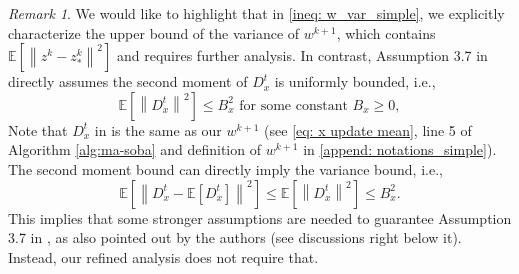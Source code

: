 \documentclass[10pt]{article}
\theoremstyle{remark}
\newtheorem*{remark}{Remark}
\newcommand{\E}{\mathbb{E}}
\newcommand{\norm}[1]{\left\|#1\right\|}
\begin{document}
\begin{remark}
    We would like to highlight that in \eqref{ineq: w_var_simple}, we explicitly characterize the upper bound of the variance of $w^{k+1}$, which contains $\E\left[\norm{z^k -z_*^k}^2\right]$ and requires further analysis. In contrast, Assumption 3.7 in \cite{dagreou2022framework} directly assumes the second moment of $D_x^t$ is uniformly bounded, i.e.,
    \[
        \E\left[\norm{D_x^t}^2\right]\leq B_x^2 \text{ for some constant } B_x \geq 0,
    \]
    Note that $D_x^t$ in \cite{dagreou2022framework} is the same as our $w^{k+1}$ (see \eqref{eq: x update mean}, line 5 of Algorithm \ref{alg:ma-soba} and definition of $w^{k+1}$ in \eqref{append: notations_simple}). The second moment bound can directly imply the variance bound, i.e.,
    \[
        \E\left[\norm{D_x^t - \E\left[D_x^t\right]}^2\right]\leq \E\left[\norm{D_x^t}^2\right]\leq B_x^2.
    \]
    This implies that some stronger assumptions are needed to guarantee Assumption 3.7 in \cite{dagreou2022framework}, as also pointed out by the authors (see discussions right below it). Instead, our refined analysis does not require that.
\end{remark}
\end{document}

